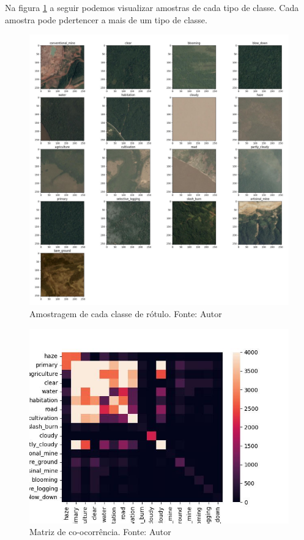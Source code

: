 Na figura \ref{fig:classes} a seguir podemos visualizar amostras de cada tipo de classe. Cada amostra pode pdertencer a mais de um tipo de classe.


\begin{figure}[!ht]
    \centering
    \includegraphics[width=\columnwidth]{Imagens/results/EDA/Class Sampling.jpg}
    \caption{Amostragem de cada classe de rótulo.
    Fonte: Autor}
   \label{fig:classes}
\end{figure}


\begin{figure}[!ht]
    \centering
    \includegraphics[width=0.5\columnwidth]{Imagens/results/EDA/Co-occurrence matrix.jpg}
    \caption{Matriz de co-ocorrência.
    Fonte: Autor}
   \label{fig:coocorrencia}
\end{figure}

